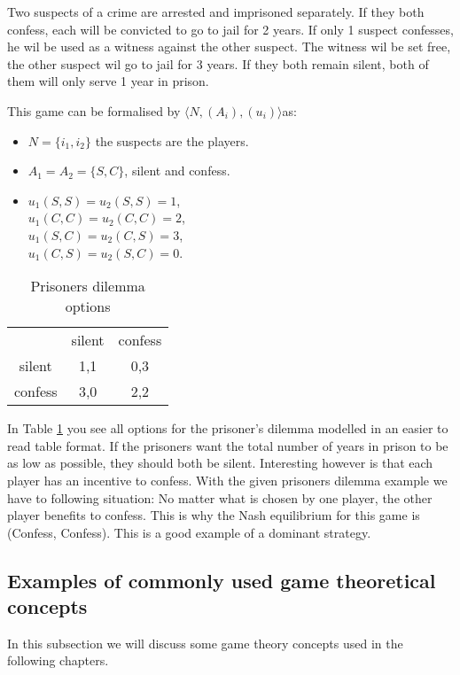 Two suspects of a crime are arrested and imprisoned separately. If they both confess, each will be convicted to go to jail for 2 years. If only 1 suspect confesses, he wil be used as a witness against the other suspect. The witness wil be set free, the other suspect wil go to jail for 3 years. If they both remain silent, both of them will only serve 1 year in prison.

This game can be formalised by $\langle N, (A_i), (u_i) \rangle$as:
\begin{itemize}
	\item $N = \{i_{1}, i_{2} \}$ the suspects are the players.
    \item $A_1 = A_2 = \{S, C\}$, silent and confess.
    \item $u_1(S, S) = u_2(S, S) = 1$, \\
    $u_1(C, C) = u_2(C, C) = 2$, \\
    $u_1(S, C) = u_2(C, S) = 3$, \\
    $u_1(C, S) = u_2(S, C) = 0$.

\end{itemize}

\begin{table}[h]
\centering
\begin{tabular}{ccc}
                             & silent                   & confess                   \\ \cline{2-3} 
\multicolumn{1}{c|}{silent}  & \multicolumn{1}{c|}{1,1} & \multicolumn{1}{c|}{0,3} \\ \cline{2-3} 
\multicolumn{1}{c|}{confess} & \multicolumn{1}{c|}{3,0} & \multicolumn{1}{c|}{2,2} \\ \cline{2-3} 
\end{tabular}
\caption{Prisoners dilemma options}
\label{prisoners-d}
\end{table}

In Table \ref{prisoners-d} you see all options for the prisoner's dilemma modelled in an easier to read table format. If the prisoners want the total number of years in prison to be as low as possible, they should both be silent. Interesting however is that each player has an incentive to confess. With the given prisoners dilemma example we have to following situation: No matter what is chosen by one player, the other player benefits to confess. This is why the Nash equilibrium for this game is (Confess, Confess). This is a good example of a dominant strategy. 

\subsection{Examples of commonly used game theoretical concepts}
In this subsection we will discuss some game theory concepts used in the following chapters. 

